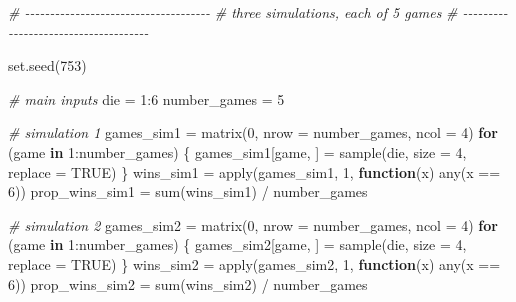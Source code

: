 \documentclass[
]{book}
\newenvironment{Shaded}{\begin{snugshade}}{\end{snugshade}}
\newcommand{\AttributeTok}[1]{\textcolor[rgb]{0.77,0.63,0.00}{#1}}
\newcommand{\CommentTok}[1]{\textcolor[rgb]{0.56,0.35,0.01}{\textit{#1}}}
\newcommand{\ConstantTok}[1]{\textcolor[rgb]{0.00,0.00,0.00}{#1}}
\newcommand{\ControlFlowTok}[1]{\textcolor[rgb]{0.13,0.29,0.53}{\textbf{#1}}}
\newcommand{\DecValTok}[1]{\textcolor[rgb]{0.00,0.00,0.81}{#1}}
\newcommand{\FunctionTok}[1]{\textcolor[rgb]{0.00,0.00,0.00}{#1}}
\newcommand{\NormalTok}[1]{#1}
\newcommand{\OtherTok}[1]{\textcolor[rgb]{0.56,0.35,0.01}{#1}}
\newcommand{\SpecialCharTok}[1]{\textcolor[rgb]{0.00,0.00,0.00}{#1}}
\begin{document}
\begin{Shaded}
\begin{Highlighting}[]
\CommentTok{\# {-}{-}{-}{-}{-}{-}{-}{-}{-}{-}{-}{-}{-}{-}{-}{-}{-}{-}{-}{-}{-}{-}{-}{-}{-}{-}{-}{-}{-}{-}{-}{-}{-}{-}{-}{-}{-}}
\CommentTok{\# three simulations, each of 5 games}
\CommentTok{\# {-}{-}{-}{-}{-}{-}{-}{-}{-}{-}{-}{-}{-}{-}{-}{-}{-}{-}{-}{-}{-}{-}{-}{-}{-}{-}{-}{-}{-}{-}{-}{-}{-}{-}{-}{-}{-}}

\FunctionTok{set.seed}\NormalTok{(}\DecValTok{753}\NormalTok{)}

\CommentTok{\# main inputs}
\NormalTok{die }\OtherTok{=} \DecValTok{1}\SpecialCharTok{:}\DecValTok{6}
\NormalTok{number\_games }\OtherTok{=} \DecValTok{5}

\CommentTok{\# simulation 1}
\NormalTok{games\_sim1 }\OtherTok{=} \FunctionTok{matrix}\NormalTok{(}\DecValTok{0}\NormalTok{, }\AttributeTok{nrow =}\NormalTok{ number\_games, }\AttributeTok{ncol =} \DecValTok{4}\NormalTok{)}
\ControlFlowTok{for}\NormalTok{ (game }\ControlFlowTok{in} \DecValTok{1}\SpecialCharTok{:}\NormalTok{number\_games) \{}
\NormalTok{  games\_sim1[game, ] }\OtherTok{=} \FunctionTok{sample}\NormalTok{(die, }\AttributeTok{size =} \DecValTok{4}\NormalTok{, }\AttributeTok{replace =} \ConstantTok{TRUE}\NormalTok{)}
\NormalTok{\}}
\NormalTok{wins\_sim1 }\OtherTok{=} \FunctionTok{apply}\NormalTok{(games\_sim1, }\DecValTok{1}\NormalTok{, }\ControlFlowTok{function}\NormalTok{(x) }\FunctionTok{any}\NormalTok{(x }\SpecialCharTok{==} \DecValTok{6}\NormalTok{))}
\NormalTok{prop\_wins\_sim1 }\OtherTok{=} \FunctionTok{sum}\NormalTok{(wins\_sim1) }\SpecialCharTok{/}\NormalTok{ number\_games}


\CommentTok{\# simulation 2}
\NormalTok{games\_sim2 }\OtherTok{=} \FunctionTok{matrix}\NormalTok{(}\DecValTok{0}\NormalTok{, }\AttributeTok{nrow =}\NormalTok{ number\_games, }\AttributeTok{ncol =} \DecValTok{4}\NormalTok{)}
\ControlFlowTok{for}\NormalTok{ (game }\ControlFlowTok{in} \DecValTok{1}\SpecialCharTok{:}\NormalTok{number\_games) \{}
\NormalTok{  games\_sim2[game, ] }\OtherTok{=} \FunctionTok{sample}\NormalTok{(die, }\AttributeTok{size =} \DecValTok{4}\NormalTok{, }\AttributeTok{replace =} \ConstantTok{TRUE}\NormalTok{)}
\NormalTok{\}}
\NormalTok{wins\_sim2 }\OtherTok{=} \FunctionTok{apply}\NormalTok{(games\_sim2, }\DecValTok{1}\NormalTok{, }\ControlFlowTok{function}\NormalTok{(x) }\FunctionTok{any}\NormalTok{(x }\SpecialCharTok{==} \DecValTok{6}\NormalTok{))}
\NormalTok{prop\_wins\_sim2 }\OtherTok{=} \FunctionTok{sum}\NormalTok{(wins\_sim2) }\SpecialCharTok{/}\NormalTok{ number\_games}



\end{Highlighting}
\end{Shaded}
\end{document}

